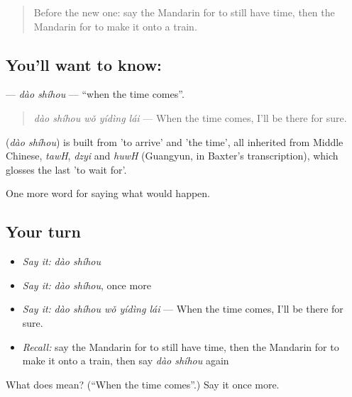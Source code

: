 \label{lesson:ZH-C391-daoshihou}



\begin{quote}
Before the new one: say the Mandarin for to still have time, then the Mandarin for to make it onto a train.
\end{quote}

\subsection*{You'll want to know: }
\textbf{} — \emph{dào shíhou} — \textquotedblleft{}when the time comes\textquotedblright{}.

\begin{quote}
\textbf{} \emph{dào shíhou wǒ yídìng lái} — When the time comes, I'll be there for sure.
\end{quote}

\begin{cousinweb}
\textbf{} (\emph{dào shíhou}) is built from  'to arrive' and  'the time', all inherited from Middle Chinese, \emph{tawH}, \emph{dzyi} and \emph{huwH} (Guangyun, in Baxter's transcription), which glosses the last 'to wait for'.
\end{cousinweb}

\begin{grammarlens}[title={What you've built}]
One more word for saying what would happen.
\end{grammarlens}

\subsection*{Your turn}
\begin{itemize}
\raggedright
  \item \emph{Say it:} \emph{dào shíhou}
  \item \emph{Say it:} \emph{dào shíhou}, once more
  \item \emph{Say it:} \emph{dào shíhou wǒ yídìng lái} — When the time comes, I'll be there for sure.
  \item \emph{Recall:} say the Mandarin for to still have time, then the Mandarin for to make it onto a train, then say \emph{dào shíhou} again
\end{itemize}

\begin{tcolorbox}[breakable,colback=teal!4,colframe=teal!35!black,title={Before you move on}]
What does  mean? (\textquotedblleft{}When the time comes\textquotedblright{}.) Say it once more.
\end{tcolorbox}

